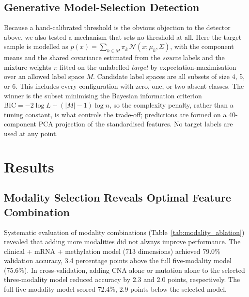 \documentclass[10pt,journal,compsoc,twocolumn]{IEEEtran}
\begin{document}
\subsection{Generative Model-Selection Detection}
\label{sec:methods_lrt}

Because a hand-calibrated threshold is the obvious objection to the detector above, we also tested a mechanism that sets no threshold at all. Here the target sample is modelled as $p(x) = \sum_{k \in M} \pi_k \, \mathcal{N}(x ; \mu_k, \Sigma)$, with the component means and the shared covariance estimated from the \emph{source} labels and the mixture weights $\pi$ fitted on the unlabelled \emph{target} by expectation-maximisation over an allowed label space $M$. Candidate label spaces are all subsets of size 4, 5, or 6. This includes every configuration with zero, one, or two absent classes. The winner is the subset minimising the Bayesian information criterion $\text{BIC} = -2\log L + (|M| - 1)\log n$, so the complexity penalty, rather than a tuning constant, is what controls the trade-off; predictions are formed on a 40-component PCA projection of the standardised features. No target labels are used at any point.

\section{Results}

\subsection{Modality Selection Reveals Optimal Feature Combination}
\label{sec:modality}

Systematic evaluation of modality combinations (Table~\ref{tab:modality_ablation}) revealed that adding more modalities did not always improve performance. The clinical + mRNA + methylation model (713 dimensions) achieved 79.0\% validation accuracy, 3.4 percentage points above the full five-modality model (75.6\%). In cross-validation, adding CNA alone or mutation alone to the selected three-modality model reduced accuracy by 2.3 and 2.0 points, respectively. The full five-modality model scored 72.4\%, 2.9 points below the selected model.
\end{document}
